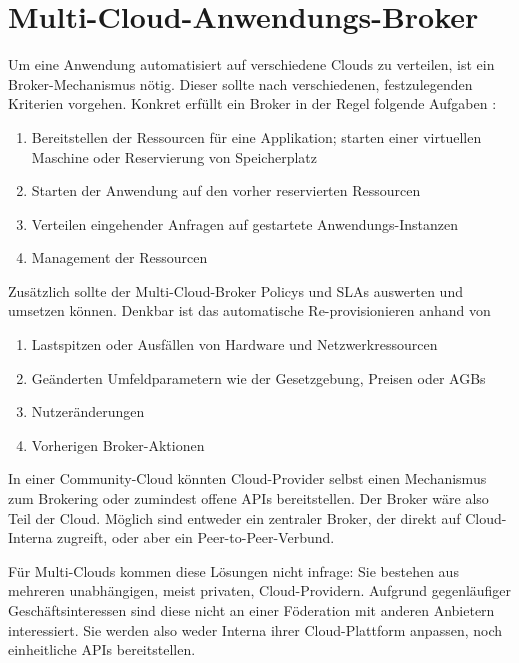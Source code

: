 \chapter{Multi-Cloud-Anwendungs-Broker}
\label{cha:broker}


Um eine Anwendung automatisiert auf verschiedene Clouds zu verteilen, ist ein Broker-Mechanismus nötig. Dieser sollte nach verschiedenen, festzulegenden Kriterien vorgehen. Konkret erfüllt ein Broker in der Regel folgende Aufgaben \cite{gartner:2017:cloud-market-multicloud-trend}:

\begin{enumerate}
	\item Bereitstellen der Ressourcen für eine Applikation; starten einer virtuellen Maschine oder Reservierung von Speicherplatz
	\item Starten der Anwendung auf den vorher reservierten Ressourcen
	\item Verteilen eingehender Anfragen auf gestartete Anwendungs-Instanzen
	\item Management der Ressourcen
\end{enumerate}

\noindent
Zusätzlich sollte der Multi-Cloud-Broker Policys und SLAs auswerten und umsetzen können. Denkbar ist das automatische Re-provisionieren anhand von 

\begin{enumerate}
	\item Lastspitzen oder Ausfällen von Hardware und Netzwerkressourcen 
	\item Geänderten Umfeldparametern wie der Gesetzgebung, Preisen oder AGBs
	\item Nutzeränderungen
	\item Vorherigen Broker-Aktionen
\end{enumerate}

\noindent
In einer Community-Cloud könnten Cloud-Provider selbst einen Mechanismus zum Brokering oder zumindest offene APIs bereitstellen. Der Broker wäre also Teil der Cloud. Möglich sind entweder ein zentraler Broker, der direkt auf Cloud-Interna zugreift, oder aber ein Peer-to-Peer-Verbund.

Für Multi-Clouds kommen diese Lösungen nicht infrage: Sie bestehen aus mehreren unabhängigen, meist privaten, Cloud-Providern. Aufgrund gegenläufiger Geschäftsinteressen sind diese nicht an einer Föderation mit anderen Anbietern interessiert. Sie werden also weder Interna ihrer Cloud-Plattform anpassen, noch einheitliche APIs bereitstellen.

